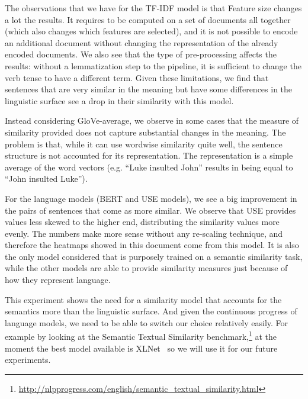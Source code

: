 The observations that we have for the TF-IDF model is that
Feature size changes a lot the results.
It requires to be computed on a set of documents all together (which also changes which features are selected), and it is not possible to encode an additional document without changing the representation of the already encoded documents.
We also see that the type of pre-processing affects the results: without a lemmatization step to the pipeline, it is sufficient to change the verb tense to have a different term.
Given these limitations, we find that sentences that are very similar in the meaning but have some differences in the linguistic surface see a drop in their similarity with this model.

Instead considering GloVe-average, we observe in some cases that the measure of similarity provided does not capture substantial changes in the meaning. The problem is that, while it can use wordwise similarity quite well, the sentence structure is not accounted for its representation. The representation is a simple average of the word vectors (e.g. ``Luke insulted John'' results in being equal to ``John insulted Luke'').

For the language models (BERT and USE models), we see a big improvement in the pairs of sentences that come as more similar.
We observe that USE provides values less skewed to the higher end, distributing the similarity values more evenly. The numbers make more sense without any re-scaling technique, and therefore the heatmaps showed in this document come from this model.
It is also the only model considered that is purposely trained on a semantic similarity task, while the other models are able to provide similarity measures just because of how they represent language.



This experiment shows the need for a similarity model that accounts for the semantics more than the linguistic surface. And given the continuous progress of language models, we need to be able to switch our choice relatively easily.
For example by looking at the Semantic Textual Similarity benchmark,\footnote{\url{http://nlpprogress.com/english/semantic_textual_similarity.html}} at the moment the best model available is XLNet~\cite{yang2019xlnet} so we will use it for our future experiments.


